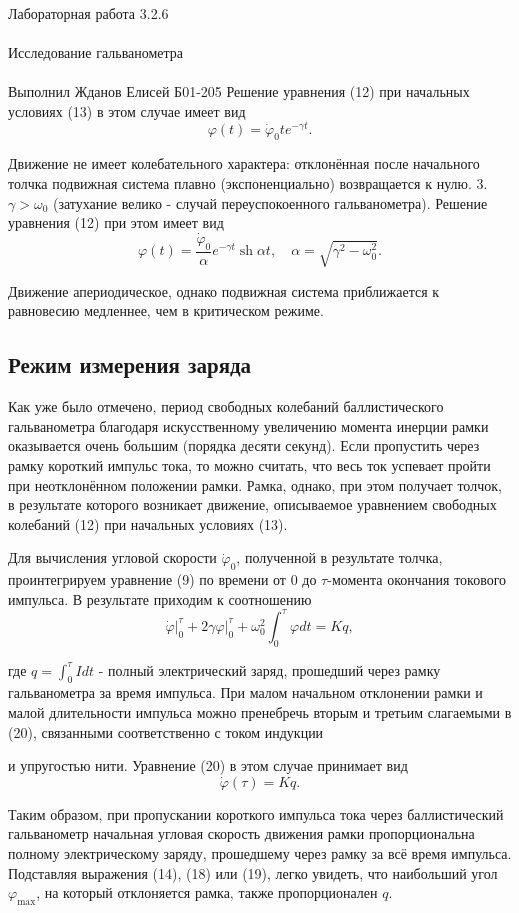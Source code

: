 \documentclass{astroedu-lab}
\begin{document}
\begin{problem}{\huge Лабораторная работа 3.2.6\\\\Исследование гальванометра\\\\Выполнил Жданов Елисей Б01-205}
Решение уравнения (12) при начальных условиях (13) в этом случае имеет вид
$$
\varphi(t)=\dot{\varphi}_0 t e^{-\gamma t} .
$$

Движение не имеет колебательного характера: отклонённая после начального толчка подвижная система плавно (экспоненциально) возвращается к нулю.
3. $\gamma>\omega_0$ (затухание велико - случай переуспокоенного гальванометра). Решение уравнения (12) при этом имеет вид
$$
\varphi(t)=\frac{\dot{\varphi}_0}{\alpha} e^{-\gamma t} \operatorname{sh} \alpha t, \quad \alpha=\sqrt{\gamma^2-\omega_0^2} .
$$

Движение апериодическое, однако подвижная система приближается к равновесию медленнее, чем в критическом режиме.

\subsection{Режим измерения заряда}

Как уже было отмечено, период свободных колебаний баллистического гальванометра благодаря искусственному увеличению момента инерции рамки оказывается очень большим (порядка десяти секунд). Если пропустить через рамку короткий импульс тока, то можно считать, что весь ток успевает пройти при неотклонённом положении рамки. Рамка, однако, при этом получает толчок, в результате которого возникает движение, описываемое уравнением свободных колебаний (12) при начальных условиях (13).

Для вычисления угловой скорости $\dot{\varphi}_0$, полученной в результате толчка, проинтегрируем уравнение (9) по времени от 0 до $\tau$-момента окончания токового импульса. В результате приходим к соотношению
$$
\left.\dot{\varphi}\right|_0 ^\tau+\left.2 \gamma \varphi\right|_0 ^\tau+\omega_0^2 \int_0^\tau \varphi d t=K q,
$$

где $q=\int_0^\tau I d t$ - полный электрический заряд, прошедший через рамку гальванометра за время импульса. При малом начальном отклонении рамки и малой длительности импульса можно пренебречь вторым и третьим слагаемыми в (20), связанными соответственно с током индукции

и упругостью нити. Уравнение (20) в этом случае принимает вид
$$
\dot{\varphi}(\tau)=K q .
$$

Таким образом, при пропускании короткого импульса тока через баллистический гальванометр начальная угловая скорость движения рамки пропорциональна полному электрическому заряду, прошедшему через рамку за всё время импульса. Подставляя выражения (14), (18) или (19), легко увидеть, что наибольший угол $\varphi_{\max }$, на который отклоняется рамка, также пропорционален $q$.


\end{problem}
\end{document}
